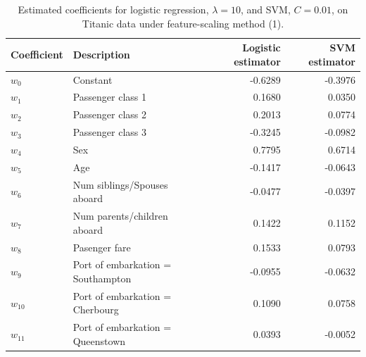 \begin{table}[h!]
\centering
\caption{Estimated coefficients for logistic regression, $\lambda = 10$, and SVM, $C = 0.01$, on Titanic data under feature-scaling method (1).}
\begin{tabular}{llrr}
	\hline 
	Coefficient & Description & Logistic estimator & SVM estimator \\
  \hline
  $w_0$  & Constant &-0.6289 & -0.3976 \\
  $w_1$ 	& Passenger class 1 & 0.1680 & 0.0350\\
  $w_2$ 	& Passenger class 2	  & 0.2013 & 0.0774\\
  $w_3$  & Passenger class 3 & -0.3245 &  -0.0982\\
  $w_4$ 	 & Sex & 0.7795 & 0.6714\\
  $w_5$ 	 & Age & -0.1417 & -0.0643\\
  $w_6$ 	 & Num siblings/Spouses aboard & -0.0477 & -0.0397\\
  $w_7$ 	 & Num parents/children aboard & 0.1422 & 0.1152\\
  $w_8$ 	 & Pasenger fare & 0.1533 &  0.0793\\
  $w_9$ 	 & Port of embarkation = Southampton & -0.0955 & -0.0632\\
  $w_{10}$  & Port of embarkation = Cherbourg & 0.1090 &  0.0758\\
  $w_{11}$ & Port of embarkation = Queenstown	& 0.0393 & -0.0052\\
  \hline
\end{tabular}\label{tab:titanic_coeff}
\end{table}


